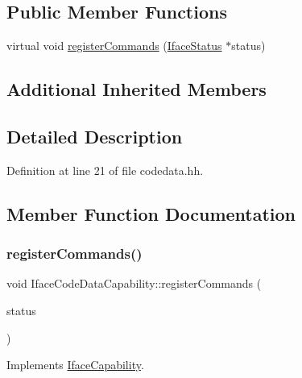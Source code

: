 \subsection*{Public Member Functions}
\begin{DoxyCompactItemize}
\item 
virtual void \mbox{\hyperlink{class_iface_code_data_capability_a04b5ffb87bb7f88afec65a0866076b33}{register\+Commands}} (\mbox{\hyperlink{class_iface_status}{Iface\+Status}} $\ast$status)
\end{DoxyCompactItemize}
\subsection*{Additional Inherited Members}


\subsection{Detailed Description}


Definition at line 21 of file codedata.\+hh.



\subsection{Member Function Documentation}
\mbox{\label{class_iface_code_data_capability_a04b5ffb87bb7f88afec65a0866076b33}} 
\subsubsection{\texorpdfstring{registerCommands()}{registerCommands()}}
{\footnotesize\ttfamily void Iface\+Code\+Data\+Capability\+::register\+Commands (\begin{DoxyParamCaption}\item[{\mbox{\hyperlink{class_iface_status}{Iface\+Status}} $\ast$}]{status }\end{DoxyParamCaption})\hspace{0.3cm}{\ttfamily [virtual]}}



Implements \mbox{\hyperlink{class_iface_capability_a8ed0987e781e5213db777be93e85af6e}{Iface\+Capability}}.



